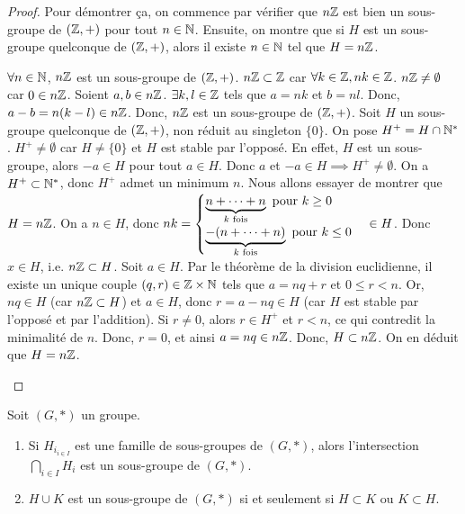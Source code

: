\documentclass[12pt,a4paper]{report}
\begin{document}
\begin{proof}
    Pour démontrer ça, on commence par vérifier que $n\mathbb{Z}$ est bien un sous-groupe de $(\mathbb{Z},+)$ pour tout $n\in\mathbb{N}$. Ensuite, on montre que si $H$ est un sous-groupe quelconque de $(\mathbb{Z},+)$, alors il existe $n\in\mathbb{N}$ tel que $H=n\mathbb{Z}$.

    \begin{outline}
        \1 $\forall n \in \mathbb{N}$, $n\mathbb{Z}$ est un sous-groupe de $(\mathbb{Z},+)$.
            \2 $n\mathbb{Z} \subset \mathbb{Z}$ car $\forall k \in \mathbb{Z}, nk \in \mathbb{Z}$.
            \2 $n\mathbb{Z} \ne \emptyset$ car $0 \in n\mathbb{Z}$.
            \2 Soient $a,b \in n\mathbb{Z}$.
                \3 $\exists k,l \in \mathbb{Z}$ tels que $a= nk$ et $b=n l$.
                \3 Donc, $a - b = n(k - l) \in n\mathbb{Z}$.
            \2 Donc, $n\mathbb{Z}$ est un sous-groupe de $(\mathbb{Z},+)$.
        \1 Soit $H$ un sous-groupe quelconque de $(\mathbb{Z},+)$, non réduit au singleton $\{0\}$.
            \2 On pose $H^+ = H \cap \mathbb{N}^*$.
            \2 $H^+ \ne \emptyset$ car $H \ne \{0\}$ et $H$ est stable par l'opposé.
            \2 En effet, $H$ est un sous-groupe, alors $-a \in H$ pour tout $a \in H$.
            \2 Donc $a$ et $-a \in H \implies H^+ \ne \emptyset$.
            \2 On a $H^+ \subset \mathbb{N}^*$, donc $H^+$ admet un minimum $n$.
            \3 Nous allons essayer de montrer que $H = n\mathbb{Z}$.
            \2 On a $n \in H$, donc $nk = \begin{cases} \underbrace{n + \dots + n}_{k \text{ fois}}\text{ pour } k \ge 0 \\ \underbrace{-(n + \dots + n)}_{k \text{ fois}}\text{ pour } k \le 0\end{cases} \in H$.
            \2 Donc $x\in H$, i.e. $n\mathbb{Z} \subset H$.
            \2 Soit $a \in H$.
                \3 Par le théorème de la division euclidienne, il existe un unique couple $(q,r) \in \mathbb{Z} \times \mathbb{N}$ tels que $a = nq + r$ et $0 \le r < n$.
                \3 Or, $nq \in H$ (car $n\mathbb{Z} \subset H$) et $a \in H$, donc $r = a - nq \in H$ (car $H$ est stable par l'opposé et par l'addition).
                \3 Si $r \ne 0$, alors $r \in H^+$ et $r < n$, ce qui contredit la minimalité de $n$.
                \3 Donc, $r = 0$, et ainsi $a = nq \in n\mathbb{Z}$.
            \2 Donc, $H \subset n\mathbb{Z}$.
            \2 On en déduit que $H = n\mathbb{Z}$.
    \end{outline}
\end{proof}

\begin{property}
    Soit $(G,*)$ un groupe.
    \begin{enumerate}
        \item Si $H_{i_{i\in I}}$ est une famille de sous-groupes de $(G,*)$, alors l'intersection $\bigcap_{i\in I} H_i$ est un sous-groupe de $(G,*)$.
        \item $H \cup K$ est un sous-groupe de $(G,*)$ si et seulement si $H \subset K$ ou $K \subset H$.
    \end{enumerate}
\end{property}
\end{document}

